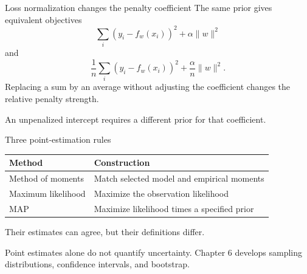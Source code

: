 \documentclass[aspectratio=169,12pt]{beamer}
\newcommand{\takeaway}[1]{\vfill{\small\color{Muted}#1\par}}
\begin{document}
\begin{frame}{Loss normalization changes the penalty coefficient}
The same prior gives equivalent objectives
\[
  \sum_i(y_i-f_w(x_i))^2+\alpha\|w\|^2
\]
and
\[
  \frac1n\sum_i(y_i-f_w(x_i))^2+\frac\alpha n\|w\|^2.
\]
Replacing a sum by an average without adjusting the coefficient
changes the relative penalty strength.
\takeaway{An unpenalized intercept requires a different prior for that coefficient.}
\end{frame}

\begin{frame}{Three point-estimation rules}
\small\renewcommand{\arraystretch}{1.6}
\begin{tabular*}{\textwidth}{@{\extracolsep{\fill}}ll@{}}
\toprule
Method & Construction\\
\midrule
Method of moments & Match selected model and empirical moments\\
Maximum likelihood & Maximize the observation likelihood\\
MAP & Maximize likelihood times a specified prior\\
\bottomrule
\end{tabular*}\par\normalsize
\vfill
Their estimates can agree, but their definitions differ.
\takeaway{Point estimates alone do not quantify uncertainty.
Chapter 6 develops sampling distributions, confidence intervals, and bootstrap.}
\end{frame}
\end{document}

